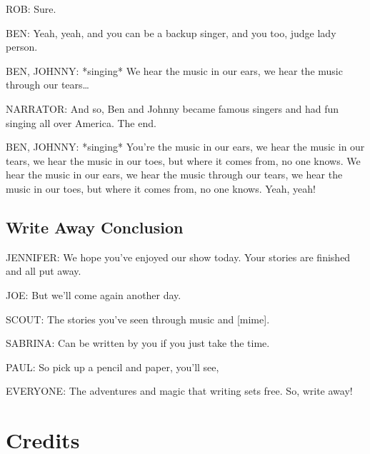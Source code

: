 ROB:
Sure.

BEN:
Yeah, yeah, and you can be a backup singer, and you too, judge lady person.

BEN, JOHNNY:
*singing*
We hear the music in our ears, we hear the music through our tears\dots

NARRATOR:
And so, Ben and Johnny became famous singers and had fun singing all over America.
The end.

BEN, JOHNNY:
*singing*
You're the music in our ears, we hear the music in our tears, we hear the music in our toes, but where it comes from, no one knows.
We hear the music in our ears, we hear the music through our tears, we hear the music in our toes, but where it comes from, no one knows.
Yeah, yeah!

\subsection{Write Away Conclusion}

JENNIFER:
We hope you've enjoyed our show today.
Your stories are finished and all put away.

JOE:
But we'll come again another day.

SCOUT:
The stories you've seen through music and [mime].

SABRINA:
Can be written by you if you just take the time.

PAUL:
So pick up a pencil and paper, you'll see,

EVERYONE:
The adventures and magic that writing sets free.
So, write away!

\section{Credits}